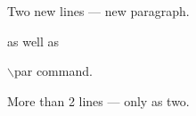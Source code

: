 \documentclass{article}
\begin{document}
\vspace*{\fill} \vspace*{-5ex}

Two new lines --- new paragraph.


as well as \par $\backslash$par command.



More than 2 lines --- only as two.

\vspace*{\fill}
\end{document}
